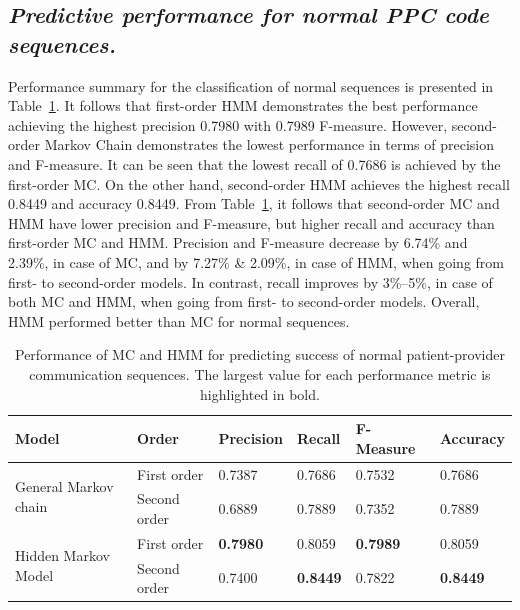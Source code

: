 \documentclass{amia}
\begin{document}
\subsection*{\textit{Predictive performance for normal PPC code sequences.}}
Performance summary for the classification of normal sequences is presented in Table~\ref{tab:result_norm_seq}. It follows that first-order HMM demonstrates the best performance achieving the highest precision 0.7980 with 0.7989 F-measure. However, second-order Markov Chain demonstrates the lowest performance in terms of precision and F-measure. It can be seen that the lowest recall of 0.7686 is achieved by the first-order MC. On the other hand, second-order HMM achieves the highest recall 0.8449 and accuracy 0.8449. From Table~\ref{tab:result_norm_seq}, it follows that second-order MC and HMM have lower precision and F-measure, but higher recall and accuracy than first-order MC and HMM. Precision and F-measure decrease by 6.74\% and 2.39\%, in case of MC, and by 7.27\% \& 2.09\%, in case of HMM, when going from first- to second-order models. In contrast, recall improves by 3\%--5\%, in case of both MC and HMM, when going from first- to second-order models. Overall, HMM performed better than MC for normal sequences. \\

\begin{table}[h]
\centering
\caption{Performance of MC and HMM for predicting success of normal patient-provider communication sequences. The largest value for each performance metric is highlighted in bold.}
\label{tab:result_norm_seq}
  \begin{tabular}{|l|l|l|l|l|l|}
  \hline
   \textbf{Model} & \textbf{Order}  & \textbf{Precision}  & \textbf{Recall} & \textbf{F-Measure} & \textbf{Accuracy}\\ \hline    
    
 \multirow{2}{*}{General Markov chain} & First order & 0.7387 & 0.7686 & 0.7532 & 0.7686\\\cline{2-6}
 & Second order & 0.6889 & 0.7889 & 0.7352 & 0.7889\\ \hline
 \multirow{2}{*}{Hidden Markov Model} & First order & \textbf{0.7980} & 0.8059 & \textbf{0.7989} & 0.8059\\ \cline{2-6}
 & Second order & 0.7400 & \textbf{0.8449} & 0.7822  & \textbf{0.8449}\\ \hline
 
  \end{tabular}
\end{table} 
\end{document}

